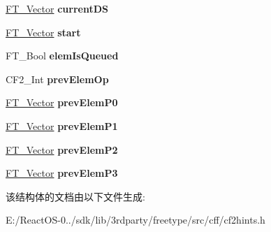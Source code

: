 \begin{DoxyCompactItemize}
\hyperlink{struct_f_t___vector__}{F\+T\+\_\+\+Vector} {\bfseries current\+DS}
\item 
\mbox{\label{struct_c_f2___glyph_path_rec___a9a9f0572cc1f6800b8861e0649f62c09}} 
\hyperlink{struct_f_t___vector__}{F\+T\+\_\+\+Vector} {\bfseries start}
\item 
\mbox{\label{struct_c_f2___glyph_path_rec___ad43b37ad4173fc8131c5863341b4d6c5}} 
F\+T\+\_\+\+Bool {\bfseries elem\+Is\+Queued}
\item 
\mbox{\label{struct_c_f2___glyph_path_rec___a6cd9752b2cee810496777e616506f74c}} 
C\+F2\+\_\+\+Int {\bfseries prev\+Elem\+Op}
\item 
\mbox{\label{struct_c_f2___glyph_path_rec___ad3886cc07890c61ca370da7902fb2c36}} 
\hyperlink{struct_f_t___vector__}{F\+T\+\_\+\+Vector} {\bfseries prev\+Elem\+P0}
\item 
\mbox{\label{struct_c_f2___glyph_path_rec___a020b66000c0d5cec70db4d38911f0b2e}} 
\hyperlink{struct_f_t___vector__}{F\+T\+\_\+\+Vector} {\bfseries prev\+Elem\+P1}
\item 
\mbox{\label{struct_c_f2___glyph_path_rec___a9a6df03953ebe1e8a977b8c17619eadb}} 
\hyperlink{struct_f_t___vector__}{F\+T\+\_\+\+Vector} {\bfseries prev\+Elem\+P2}
\item 
\mbox{\label{struct_c_f2___glyph_path_rec___ae92151111dcc427203aa39df98e82238}} 
\hyperlink{struct_f_t___vector__}{F\+T\+\_\+\+Vector} {\bfseries prev\+Elem\+P3}
\end{DoxyCompactItemize}


该结构体的文档由以下文件生成\+:\begin{DoxyCompactItemize}
\item 
E\+:/\+React\+O\+S-\/0../sdk/lib/3rdparty/freetype/src/cff/cf2hints.\+h\end{DoxyCompactItemize}
